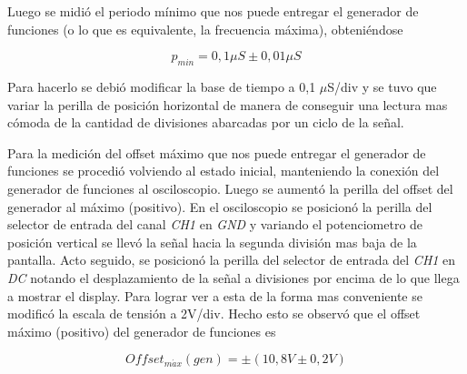 \documentclass{article}
\begin{document}
	Luego se midió el periodo mínimo que nos puede entregar el generador de funciones (o lo que es equivalente, la frecuencia máxima), obteniéndose

\begin{equation*}
	p_{min} = 0,1\mu S \pm 0,01\mu S
\end{equation*}
\medskip

\noindent Para hacerlo se debió modificar la base de tiempo a 0,1 $\mu$S/div y se tuvo que variar la perilla de posición horizontal de manera de conseguir una lectura mas cómoda de la cantidad de divisiones abarcadas por un ciclo de la señal.
	\par
	Para la medición del offset máximo que nos puede entregar el generador de funciones se procedió volviendo al estado inicial, manteniendo la conexión del generador de funciones al osciloscopio. Luego se aumentó la perilla del offset del generador al máximo (positivo). En el osciloscopio se posicionó la perilla del selector de entrada del canal \textit{CH1} en \textit{GND} y variando el potenciometro de posición vertical se llevó la señal hacia la segunda división mas baja de la pantalla. Acto seguido, se posicionó la perilla del selector de entrada del \textit{CH1} en \textit{DC} notando el desplazamiento de la señal a divisiones por encima de lo que llega a mostrar el display. Para lograr ver a esta de la forma mas conveniente se modificó la escala de tensión a 2V/div. Hecho esto se observó que el offset máximo (positivo) del generador de funciones es

\begin{equation*}
	Offset_{m\acute{a}x}(gen) = \pm (10,8V \pm 0,2V)
\end{equation*}
\medskip
\end{document}

